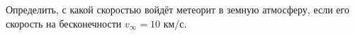 Определить, с какой скоростью войдёт метеорит в земную атмосферу, если
его скорость на бесконечности $v_\infty=10$ км/с.
